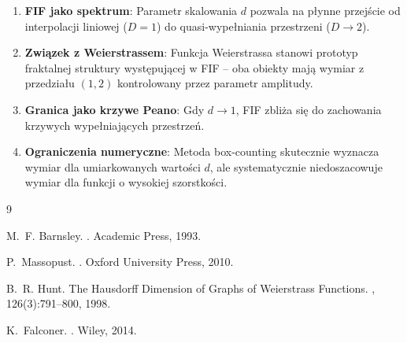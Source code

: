 \documentclass[11pt,a4paper]{article}
\begin{document}
\begin{enumerate}
    \item \textbf{FIF jako spektrum}: Parametr skalowania $d$ pozwala na płynne przejście od interpolacji liniowej ($D=1$) do quasi-wypełniania przestrzeni ($D \to 2$).

    \item \textbf{Związek z Weierstrassem}: Funkcja Weierstrassa stanowi prototyp fraktalnej struktury występującej w FIF -- oba obiekty mają wymiar z przedziału $(1, 2)$ kontrolowany przez parametr amplitudy.

    \item \textbf{Granica jako krzywe Peano}: Gdy $d \to 1$, FIF zbliża się do zachowania krzywych wypełniających przestrzeń.

    \item \textbf{Ograniczenia numeryczne}: Metoda box-counting skutecznie wyznacza wymiar dla umiarkowanych wartości $d$, ale systematycznie niedoszacowuje wymiar dla funkcji o wysokiej szorstkości.
\end{enumerate}

\begin{thebibliography}{9}

M.~F. Barnsley.
.
\newblock Academic Press, 1993.

P.~Massopust.
.
\newblock Oxford University Press, 2010.

B.~R. Hunt.
\newblock The Hausdorff Dimension of Graphs of Weierstrass Functions.
, 126(3):791--800, 1998.

K.~Falconer.
.
\newblock Wiley, 2014.

\end{thebibliography}
\end{document}
